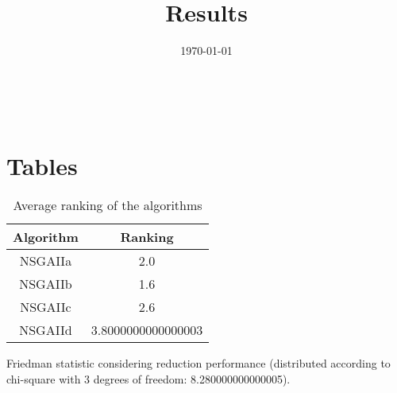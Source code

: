 \documentclass{article}
\title{Results}
\author{}
\date{\today}
\begin{document}
\oddsidemargin 0in \topmargin 0in\maketitle
\
\section{Tables}
\begin{table}[!htp]
\centering
\caption{Average ranking of the algorithms}
\begin{tabular}{c|c}
Algorithm&Ranking\\
\hline
NSGAIIa&2.0\\
NSGAIIb&1.6\\
NSGAIIc&2.6\\
NSGAIId&3.8000000000000003\\
\end{tabular}
\end{table}


Friedman statistic considering reduction performance (distributed according to chi-square with 3 degrees of freedom: 8.280000000000005).
\end{document}
